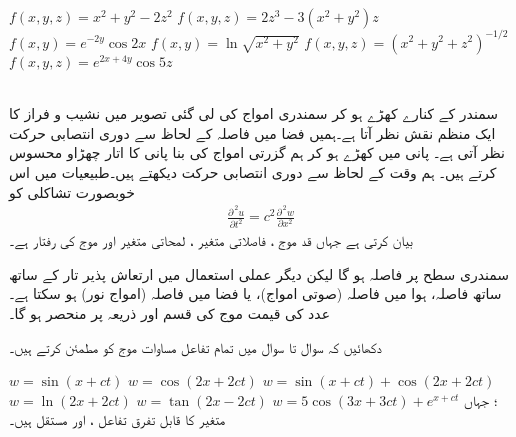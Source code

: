 $f(x,y,z)=x^2+y^2-2z^2$
$f(x,y,z)=2z^3-3(x^2+y^2)z$
$f(x,y)=e^{-2y}\cos 2x$
$f(x,y)=\ln\sqrt{x^2+y^2}$
$f(x,y,z)=(x^2+y^2+z^2)^{-1/2}$
$f(x,y,z)=e^{2x+4y}\cos 5z$

\\
سمندر  کے کنارے کھڑے  ہو کر سمندری امواج کی لی گئی  تصویر  میں نشیب و فراز کا   ایک منظم نقش نظر آتا ہے۔ہمیں  فضا میں  فاصلہ کے لحاظ سے   دوری انتصابی حرکت نظر آتی ہے۔ پانی میں کھڑے ہو کر ہم گزرتی امواج کی بنا پانی کا اتار چھڑاو محسوس کرتے ہیں۔ ہم وقت کے لحاظ سے دوری انتصابی حرکت  دیکھتے ہیں۔طبیعیات  میں اس خوبصورت   تشاکلی کو 
\begin{align}
\frac{\partial^{\,2}u}{\partial t^2}=c^2\frac{\partial ^{\,2}w}{\partial x^2}
\end{align}
بیان کرتی ہے جہاں  قد موج  ، فاصلاتی متغیر  ، لمحاتی متغیر  اور موج کی رفتار    ہے۔ 

سمندری سطح پر فاصلہ  ہو گا لیکن دیگر عملی استعمال میں   ارتعاش پذیر  تار کے ساتھ ساتھ  فاصلہ، ہوا میں فاصلہ (صوتی امواج)، یا فضا میں فاصلہ  (امواج نور)  ہو سکتا ہے۔  عدد  کی قیمت موج کی قسم اور  ذریعہ پر منحصر ہو  گا۔

دکھائیں کہ سوال  تا سوال   میں تمام  تفاعل مساوات موج کو مطمئن کرتے ہیں۔ 

$w=\sin(x+ct)$
$w=\cos(2x+2ct)$
$w=\sin(x+ct)+\cos(2x+2ct)$
$w=\ln(2x+2ct)$
$w=\tan(2x-2ct)$
$w=5\cos(3x+3ct)+e^{x+ct}$
؛ جہاں  متغیر  کا قابل تفرق تفاعل ،   اور   مستقل ہیں۔



